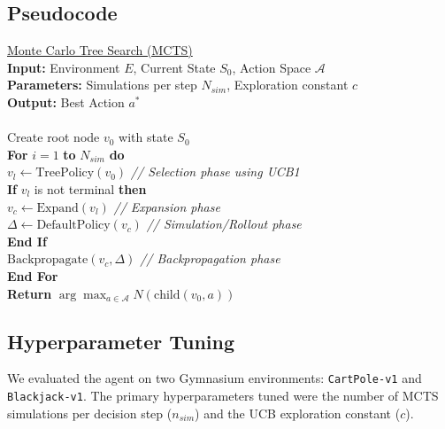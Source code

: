 \documentclass{article}
\begin{document}
\subsection{Pseudocode}
\begin{tcolorbox}[arc=0mm,width=(\linewidth - 0.2cm)] 
	\begin{tabbing}
		{\sc \underline{Monte Carlo Tree Search (MCTS)}}\\
    \textbf{Input:} Environment $E$, Current State $S_0$, Action Space $\mathcal{A}$ \\
    \textbf{Parameters:} Simulations per step $N_{sim}$, Exploration constant $c$ \\
    \textbf{Output:} Best Action $a^*$ \\
    \\
    Create root node $v_0$ with state $S_0$ \\
    \textbf{For} $i = 1$ \textbf{to} $N_{sim}$ \textbf{do} \\
        \hspace{0.5cm} $v_l \gets \text{TreePolicy}(v_0)$ \textit{// Selection phase using UCB1} \\
        \hspace{0.5cm} \textbf{If} $v_l$ is not terminal \textbf{then} \\
        \hspace{1.0cm} $v_c \gets \text{Expand}(v_l)$ \textit{// Expansion phase} \\
        \hspace{1.0cm} $\Delta \gets \text{DefaultPolicy}(v_c)$ \textit{// Simulation/Rollout phase} \\
        \hspace{0.5cm} \textbf{End If} \\
        \hspace{0.5cm} $\text{Backpropagate}(v_c, \Delta)$ \textit{// Backpropagation phase} \\
    \textbf{End For} \\
    \textbf{Return} $\arg\max_{a \in \mathcal{A}} N(\text{child}(v_0, a))$
	\end{tabbing}
\end{tcolorbox}

\subsection{Hyperparameter Tuning}
We evaluated the agent on two Gymnasium environments: \texttt{CartPole-v1} and \texttt{Blackjack-v1}. The primary hyperparameters tuned were the number of MCTS simulations per decision step ($n_{sim}$) and the UCB exploration constant ($c$).
\end{document}
